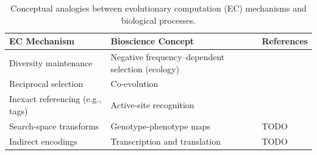\begin{table}
\footnotesize

\centering
\caption{Conceptual analogies between evolutionary computation (EC) mechanisms and biological processes.}
\label{tab:bioinspiration}
\renewcommand{\arraystretch}{1.6} %

\begin{tabular}{@{}p{4.2cm}p{4.2cm}p{4.5cm}@{}}
\toprule
\textbf{EC Mechanism} & \textbf{Bioscience Concept} & \textbf{References} \\
\midrule
Diversity maintenance & Negative frequency--dependent selection (ecology) & \citep{dolson2018ecological,dolson2018applying} \\
Reciprocal selection & Co-evolution & \citep{lehman2010efficiently,harper2012spatial,garbus2024accelerating,koza1991genetic,kala2012multi,wang2019poet,miikkulainen2024evolving} \\
Inexact referencing (e.g., tags) & Active-site recognition & \citep{spector2011tag,moreno2023matchmaker,lalejini2018signalgp,downing2015intelligence} \\
Search-space transforms & Genotype-phenotype maps & \citep{lehman2023evolution,moreno2018learning,bentley2022evolving,gaier2020discovering,wittenberg2023denoising} TODO \\
Indirect encodings & Transcription and translation & TODO \\
\bottomrule
\end{tabular}
\end{table}

